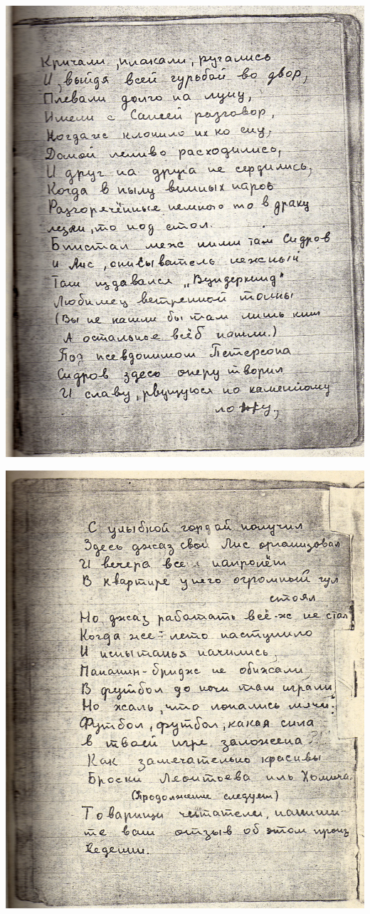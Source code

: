 \noindent
\includegraphics[width=\textwidth]{inc/Vynd/Vynd006}

\noindent
\includegraphics[width=\textwidth]{inc/Vynd/Vynd007}

